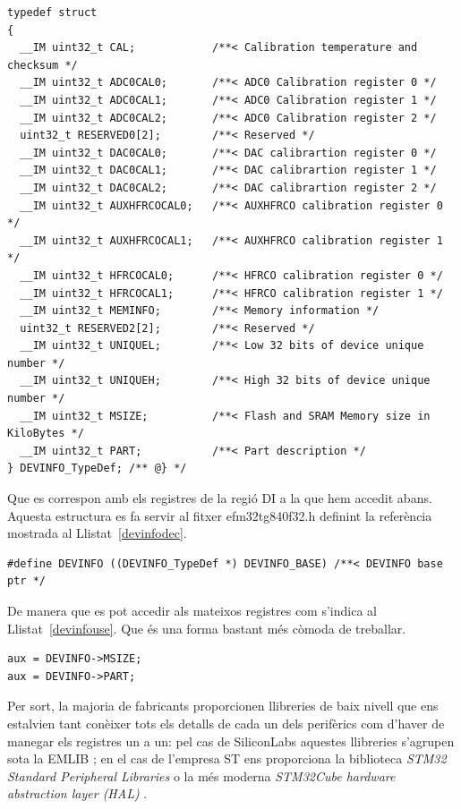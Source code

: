 \begin{lstlisting}[label=devinfo,caption={Exemple de definició d'estructura per accedir a memòria},style=customc]
typedef struct
{
  __IM uint32_t CAL;            /**< Calibration temperature and checksum */
  __IM uint32_t ADC0CAL0;       /**< ADC0 Calibration register 0 */
  __IM uint32_t ADC0CAL1;       /**< ADC0 Calibration register 1 */
  __IM uint32_t ADC0CAL2;       /**< ADC0 Calibration register 2 */
  uint32_t RESERVED0[2];        /**< Reserved */
  __IM uint32_t DAC0CAL0;       /**< DAC calibrartion register 0 */
  __IM uint32_t DAC0CAL1;       /**< DAC calibrartion register 1 */
  __IM uint32_t DAC0CAL2;       /**< DAC calibrartion register 2 */
  __IM uint32_t AUXHFRCOCAL0;   /**< AUXHFRCO calibration register 0 */
  __IM uint32_t AUXHFRCOCAL1;   /**< AUXHFRCO calibration register 1 */
  __IM uint32_t HFRCOCAL0;      /**< HFRCO calibration register 0 */
  __IM uint32_t HFRCOCAL1;      /**< HFRCO calibration register 1 */
  __IM uint32_t MEMINFO;        /**< Memory information */
  uint32_t RESERVED2[2];        /**< Reserved */
  __IM uint32_t UNIQUEL;        /**< Low 32 bits of device unique number */
  __IM uint32_t UNIQUEH;        /**< High 32 bits of device unique number */
  __IM uint32_t MSIZE;          /**< Flash and SRAM Memory size in KiloBytes */
  __IM uint32_t PART;           /**< Part description */
} DEVINFO_TypeDef; /** @} */
\end{lstlisting}

Que es correspon amb els registres de la regió DI a la que hem accedit abans. Aquesta estructura es fa servir al fitxer efm32tg840f32.h definint la referència mostrada al Llistat~\ref {devinfodec}.

\begin{lstlisting}[label=devinfodec,caption={Declaració d'una variable d'accés a la memòria estructurada},style=customc]
#define DEVINFO ((DEVINFO_TypeDef *) DEVINFO_BASE) /**< DEVINFO base ptr */
\end{lstlisting}

De manera que es pot accedir als mateixos registres com s'indica al Llistat~\ref {devinfouse}. Que és una forma bastant més còmoda de treballar.

\begin{lstlisting}[label=devinfouse,caption={Ús de l'estructura d'accés},style=customc]
aux = DEVINFO->MSIZE;
aux = DEVINFO->PART;
\end{lstlisting}

Per sort, la majoria de fabricants proporcionen llibreries de baix nivell que ens estalvien tant conèixer tots els detalls de cada un dels perifèrics com d'haver de manegar els registres un a un: pel cas de SiliconLabs aquestes llibreries s'agrupen sota la EMLIB \cite{EMLIB}; en el cas de l'empresa ST ens proporciona la biblioteca {\em STM32 Standard Peripheral Libraries} \cite{STM32Lib} o la més moderna {\em  STM32Cube hardware abstraction layer (HAL)} \cite{STM32CubeHAL}.

